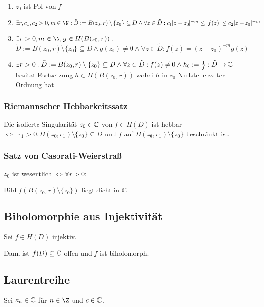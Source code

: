 \begin{enumerate}[label=(\alph*)]
	\item $z_0$ ist Pol von $f$
	\item $\exists r, c_1, c_2 > 0, m \in \N : \tilde D := B(z_0,r) \setminus \{z_0\} \subseteq D \land \forall z \in \tilde D : c_1|z-z_0|^{-m} \leq |f(z)| \leq c_2|z-z_0|^{-m}$
	\item $\exists r > 0, m \in \N, g \in H(B(z_0,r)) :$ \\ $\tilde D := B(z_0,r) \setminus \{z_0\} \subseteq D \land g(z_0) \neq 0 \land \forall z \in \tilde D : f(z) = (z-z_0)^{-m}g(z)$
	\item $\exists r > 0 : \tilde D := B(z_0,r) \setminus \{z_0\} \subseteq D \land \forall z \in \tilde D : f(z) \neq 0 \land h_0 := \frac{1}{f} : \tilde D \to \mathbb{C}$ besitzt Fortsetzung $h \in H(B(z_0,r))$ wobei $h$ in $z_0$ Nullstelle $m$-ter Ordnung hat
\end{enumerate}

\subsubsection*{Riemannscher Hebbarkeitssatz}

Die isolierte Singularität $z_0 \in \mathbb{C}$ von $f \in H(D)$ ist hebbar $\iff \exists r_1 > 0 : B(z_0,r_1) \setminus \{z_0\} \subseteq D$ und $f$ auf $B(z_0,r_1) \setminus \{z_0\}$ beschränkt ist.

\subsubsection*{Satz von Casorati-Weierstraß}

$z_0$ ist wesentlich $\iff \forall r > 0 :$

Bild $f(B(z_0,r) \setminus \{z_0\})$ liegt dicht in $\mathbb{C}$

\subsection*{Biholomorphie aus Injektivität}

Sei $f \in H(D)$ injektiv.

Dann ist $f(D) \subseteq \mathbb{C}$ offen und $f$ ist biholomorph.

\subsection*{Laurentreihe}

Sei $a_n \in \mathbb{C}$ für $n \in \Z$ und $c \in \mathbb{C}$.

